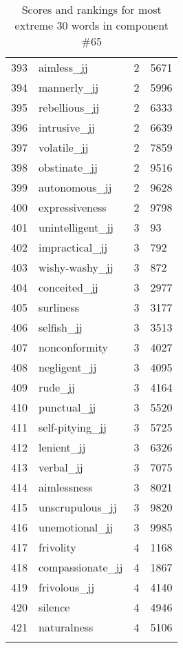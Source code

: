 \begin{longtable}[!htbp]{| rlr@{.}l |}
    393 & aimless\_jj & 2 & 5671 \\
    394 & mannerly\_jj & 2 & 5996 \\
    395 & rebellious\_jj & 2 & 6333 \\
    396 & intrusive\_jj & 2 & 6639 \\
    397 & volatile\_jj & 2 & 7859 \\
    398 & obstinate\_jj & 2 & 9516 \\
    399 & autonomous\_jj & 2 & 9628 \\
    400 & expressiveness & 2 & 9798 \\
    401 & unintelligent\_jj & 3 & 93 \\
    402 & impractical\_jj & 3 & 792 \\
    403 & wishy-washy\_jj & 3 & 872 \\
    404 & conceited\_jj & 3 & 2977 \\
    405 & surliness & 3 & 3177 \\
    406 & selfish\_jj & 3 & 3513 \\
    407 & nonconformity & 3 & 4027 \\
    408 & negligent\_jj & 3 & 4095 \\
    409 & rude\_jj & 3 & 4164 \\
    410 & punctual\_jj & 3 & 5520 \\
    411 & self-pitying\_jj & 3 & 5725 \\
    412 & lenient\_jj & 3 & 6326 \\
    413 & verbal\_jj & 3 & 7075 \\
    414 & aimlessness & 3 & 8021 \\
    415 & unscrupulous\_jj & 3 & 9820 \\
    416 & unemotional\_jj & 3 & 9985 \\
    417 & frivolity & 4 & 1168 \\
    418 & compassionate\_jj & 4 & 1867 \\
    419 & frivolous\_jj & 4 & 4140 \\
    420 & silence & 4 & 4946 \\
    421 & naturalness & 4 & 5106 \\
    \hline
    \caption{Scores and rankings for most extreme 30 words in component \#65} \\
\end{longtable}
